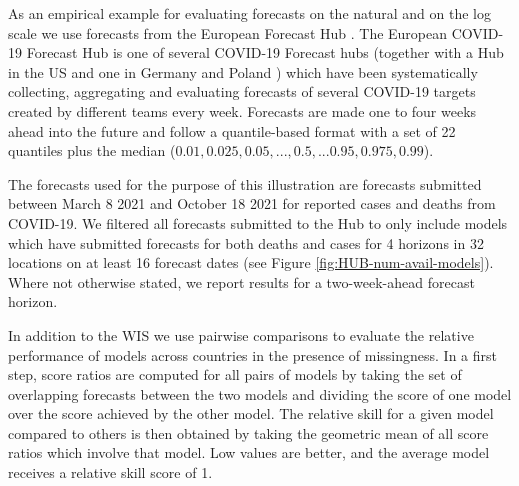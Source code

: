 \documentclass{article}
\begin{document}
As an empirical example for evaluating forecasts on the natural and on the log scale we use forecasts from the European Forecast Hub \citep{europeancovid-19forecasthubEuropeanCovid19Forecast2021, sherrattPredictivePerformanceMultimodel2022}. 
The European COVID-19 Forecast Hub is one of several COVID-19 Forecast hubs (together with a Hub in the US \citep{cramerEvaluationIndividualEnsemble2021} and one in Germany and Poland \citep{bracherShorttermForecastingCOVID192021}) which have been systematically collecting, aggregating and evaluating forecasts of several COVID-19 targets created by different teams every week. Forecasts are made one to four weeks ahead into the future and follow a quantile-based format with a set of 22 quantiles plus the median ($0.01, 0.025, 0.05, ..., 0.5, ... 0.95, 0.975, 0.99$). 

The forecasts used for the purpose of this illustration are forecasts submitted between March 8 2021 and October 18 2021 for reported cases and deaths from COVID-19. We filtered all forecasts submitted to the Hub to only include models which have submitted forecasts for both deaths and cases for 4 horizons in 32 locations on at least 16 forecast dates (see Figure \ref{fig:HUB-num-avail-models}). Where not otherwise stated, we report results for a two-week-ahead forecast horizon. 

In addition to the WIS we use pairwise comparisons \citep{cramerEvaluationIndividualEnsemble2021} to evaluate the relative performance of models across countries in the presence of missingness. In a first step, score ratios are computed for all pairs of models by taking the set of overlapping forecasts between the two models and dividing the score of one model over the score achieved by the other model. The relative skill for a given model compared to others is then obtained by taking the geometric mean of all score ratios which involve that model. Low values are better, and the average model receives a relative skill score of 1. 

% 
\end{document}
